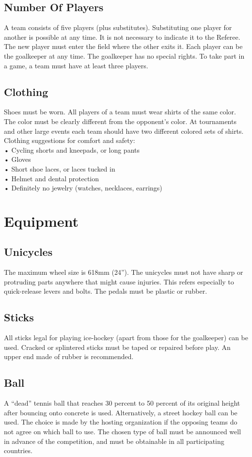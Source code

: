 \subsection{Number Of Players}
A team consists of five players (plus substitutes). Substituting one player for another is possible at any time. It is not
necessary to indicate it to the Referee. The new player must enter the field where the other exits it. Each player can be
the goalkeeper at any time. The goalkeeper has no special rights. To take part in a game, a team must have at least three
players.
\subsection{Clothing}
Shoes must be worn. All players of a team must wear shirts of the same color. The color must be clearly different from
the opponent’s color. At tournaments and other large events each team should have two different colored sets of shirts.\\
Clothing suggestions for comfort and safety:\\
• Cycling shorts and kneepads, or long pants\\
• Gloves\\
• Short shoe laces, or laces tucked in\\
• Helmet and dental protection\\
• Definitely no jewelry (watches, necklaces, earrings)\\
\section{Equipment}
\subsection{Unicycles}
The maximum wheel size is 618mm (24”). The unicycles must not have sharp or protruding parts anywhere that might
cause injuries. This refers especially to quick-release levers and bolts. The pedals must be plastic or rubber.
\subsection{Sticks}
All sticks legal for playing ice-hockey (apart from those for the goalkeeper) can be used. Cracked or splintered sticks
must be taped or repaired before play. An upper end made of rubber is recommended.
\subsection{Ball}
A “dead” tennis ball that reaches 30 percent to 50 percent of its original height after bouncing onto concrete is used.
Alternatively, a street hockey ball can be used. The choice is made by the hosting organization if the opposing teams
do not agree on which ball to use. The chosen type of ball must be announced well in advance of the competition, and
must be obtainable in all participating countries.
